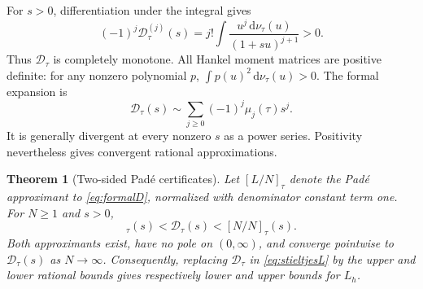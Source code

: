 \documentclass[11pt,a4paper]{article}
\newcommand{\dd}{\,\mathrm d}
\newcommand{\D}{\mathcal D}
\numberwithin{equation}{section}
\theoremstyle{plain}
\newtheorem{theorem}{Theorem}[section]
\theoremstyle{definition}
\theoremstyle{remark}
\begin{document}
For $s>0$, differentiation under the integral gives
\begin{equation}
 (-1)^j\D_\tau^{(j)}(s)
    =j!\int\frac{u^j\dd\nu_\tau(u)}{(1+su)^{j+1}}>0.
 \label{eq:complete}
\end{equation}
Thus $\D_\tau$ is completely monotone. All Hankel moment matrices are
positive definite: for any nonzero polynomial $p$,
$\int p(u)^2\dd\nu_\tau(u)>0$. The formal expansion is
\begin{equation}
 \D_\tau(s)\sim\sum_{j\ge0}(-1)^j\mu_j(\tau)s^j.
 \label{eq:formalD}
\end{equation}
It is generally divergent at every nonzero $s$ as a power series. Positivity
nevertheless gives convergent rational approximations.

\begin{theorem}[Two-sided Pad\'e certificates]
\label{thm:pade}
Let $[L/N]_\tau$ denote the Pad\'e approximant to \eqref{eq:formalD}, normalized
with denominator constant term one. For $N\ge1$ and $s>0$,
\begin{equation}
 [N-1/N]_\tau(s)<\D_\tau(s)<[N/N]_\tau(s).
 \label{eq:padebound}
\end{equation}
Both approximants exist, have no pole on $(0,\infty)$, and converge pointwise
to $\D_\tau(s)$ as $N\to\infty$. Consequently, replacing $\D_\tau$ in
\eqref{eq:stieltjesL} by the upper and lower rational bounds gives respectively
lower and upper bounds for $L_h$.
\end{theorem}
\end{document}
